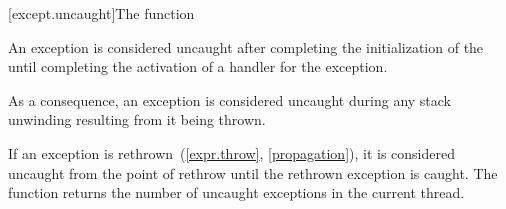 [except.uncaught]{The  function}%

\pnum
An exception is considered uncaught
after completing the initialization of the 
until completing the activation of a handler for the exception.
\begin{note}
As a consequence, an exception is considered uncaught
during any stack unwinding resulting from it being thrown.
\end{note}
If an exception is rethrown~(\ref{expr.throw}, \ref{propagation}),
it is considered uncaught from the point of rethrow
until the rethrown exception is caught.
The function 
returns the number of uncaught exceptions in the current thread.%

